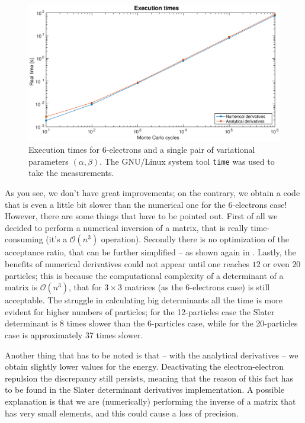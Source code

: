 \documentclass[a4paper,twoside,11pt]{book}
\begin{document}
\begin{figure}[H]
	\centering
	\includegraphics[width=\textwidth]{times_6e}
	\caption{Execution times for 6-electrons and a single pair of variational parameters $(\alpha,\beta)$. The GNU/Linux system tool \texttt{time} was used to take the measurements.}
	\label{fig:times_6e}
\end{figure}

As you see, we don't have great improvements; on the contrary, we obtain a code that is even a little bit slower than the numerical one for the 6-electrons case! However, there are some things that have to be pointed out. First of all we decided to perform a numerical inversion of a matrix, that is really time-consuming (it's a $\mathcal{O}(n^3)$ operation). Secondly there is no optimization of the acceptance ratio, that can be further simplified -- as shown again in \cite{Hoegberget2013}. Lastly, the benefits of numerical derivatives could not appear until one reaches $12$ or even $20$ particles; this is because the computational complexity of a determinant of a matrix is $\mathcal{O}(n^3)$, that for $3 \times 3$ matrices (as the 6-electrons case) is still acceptable. The struggle in calculating big determinants all the time is more evident for higher numbers of particles; for the 12-particles case the Slater determinant is 8 times slower than the 6-particles case, while for the 20-particles case is approximately 37 times slower.

Another thing that has to be noted is that -- with the analytical derivatives -- we obtain slightly lower values for the energy. Deactivating the electron-electron repulsion the discrepancy still persists, meaning that the reason of this fact has to be found in the Slater determinant derivatives implementation. A possible explanation is that we are (numerically) performing the inverse of a matrix that has very small elements, and this could cause a loss of precision.
\end{document}
